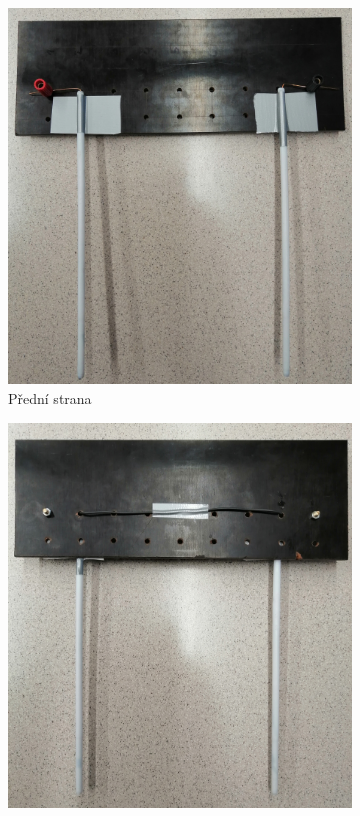 \documentclass[smaller,aspectratio=1610,handout]{beamer}
\begin{document}
\begin{frame}
	\begin{figure}[htpb]
		\hfill
		\centering
		\begin{subfigure}{0.48\textwidth}
			\centering
			\includegraphics[height=0.8\textheight]{termoclanek_front.jpg}
			\caption{Přední strana}
		\end{subfigure}
		\hfill
		\begin{subfigure}{0.48\textwidth}
			\centering
			\includegraphics[height=0.8\textheight]{termoclanek_back.jpg}

\end{subfigure}
\end{figure}
\end{frame}
\end{document}
